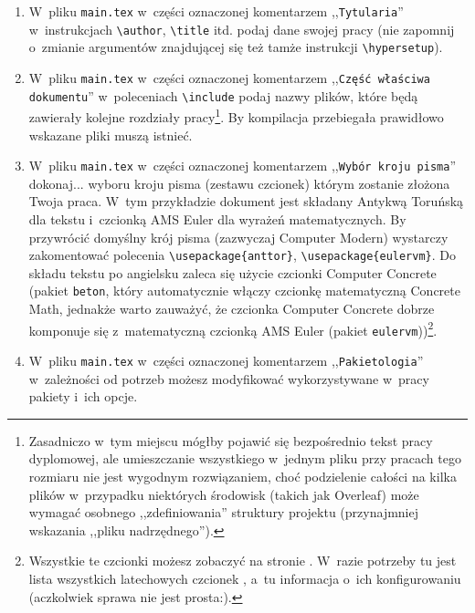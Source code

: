 \begin{enumerate}

\item W~pliku \texttt{main.tex} w~części oznaczonej komentarzem ,,\texttt{Tytularia}'' w~instrukcjach \texttt{\textbackslash author}, \texttt{\textbackslash title} itd. podaj dane swojej pracy (nie zapomnij o~zmianie argumentów znajdującej się też tamże instrukcji \texttt{\textbackslash hypersetup}). 
  
\item W~pliku \texttt{main.tex} w~części oznaczonej komentarzem ,,\texttt{Część właściwa do\-ku\-men\-tu}'' w~poleceniach \texttt{\textbackslash include} podaj nazwy plików, które będą zawierały kolejne rozdziały pracy\footnote{Zasadniczo w~tym miejscu mógłby pojawić się bezpośrednio tekst pracy dyplomowej, ale umieszczanie wszystkiego w~jednym pliku przy pracach tego rozmiaru nie jest wygodnym rozwiązaniem, choć podzielenie całości na kilka plików w~przypadku niektórych środowisk (takich jak Overleaf) może wymagać osobnego ,,zdefiniowania'' struktury projektu (przynajmniej wskazania ,,pliku nadrzędnego'').}. By kompilacja przebiegała prawidłowo wskazane pliki muszą istnieć.

\item W~pliku \texttt{main.tex} w~części oznaczonej komentarzem ,,\texttt{Wybór kroju pisma}'' dokonaj... wyboru kroju pisma (zestawu czcionek) którym zostanie złożona Twoja praca. W~tym przykładzie dokument jest składany Antykwą Toruńską dla tekstu i~czcionką AMS Euler dla wyrażeń matematycznych. By przywrócić domyślny krój pisma (zazwyczaj Computer Modern) wystarczy zakomentować polecenia \texttt{\textbackslash usepackage\{anttor\}}, \texttt{\textbackslash usepackage\{eulervm\}}. Do składu tekstu po angielsku zaleca się użycie czcionki Computer Concrete (pakiet \texttt{beton}, który automatycznie włączy czcionkę matematyczną Concrete Math, jednakże warto zauważyć, że czcionka Computer Concrete dobrze komponuje się z~matematyczną czcionką AMS Euler (pakiet \texttt{eulervm}))\footnote{Wszystkie te czcionki możesz zobaczyć na stronie \cite{czcionki_szer}. W~razie potrzeby tu jest lista wszystkich latechowych czcionek \cite{czcionki}, a~tu informacja o~ich konfigurowaniu \cite{czcionki_sel} (aczkolwiek sprawa nie jest prosta:).}.

\item W~pliku \texttt{main.tex} w~części oznaczonej komentarzem ,,\texttt{Pakietologia}'' w~zależności od potrzeb możesz modyfikować wykorzystywane w~pracy pakiety i~ich opcje.


\end{enumerate}
